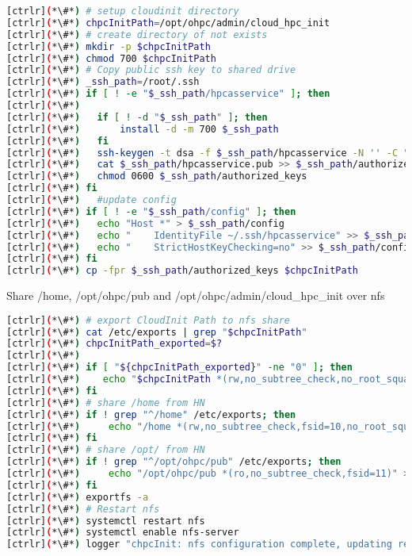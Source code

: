 \begin{lstlisting}[language=bash,keywords={}]
[ctrlr](*\#*) # setup cloudinit directory
[ctrlr](*\#*) chpcInitPath=/opt/ohpc/admin/cloud_hpc_init
[ctrlr](*\#*) # create directory of not exists
[ctrlr](*\#*) mkdir -p $chpcInitPath
[ctrlr](*\#*) chmod 700 $chpcInitPath
[ctrlr](*\#*) # Copy public ssh key to shared drive
[ctrlr](*\#*) _ssh_path=/root/.ssh
[ctrlr](*\#*) if [ ! -e "$_ssh_path/hpcasservice" ]; then
[ctrlr](*\#*) 
[ctrlr](*\#*) 	if [ ! -d "$_ssh_path" ]; then
[ctrlr](*\#*) 		install -d -m 700 $_ssh_path
[ctrlr](*\#*) 	fi
[ctrlr](*\#*) 	ssh-keygen -t dsa -f $_ssh_path/hpcasservice -N '' -C "HPC Cluster key" > /dev/null 2>&1
[ctrlr](*\#*) 	cat $_ssh_path/hpcasservice.pub >> $_ssh_path/authorized_keys
[ctrlr](*\#*) 	chmod 0600 $_ssh_path/authorized_keys
[ctrlr](*\#*) fi
[ctrlr](*\#*) 	#update config
[ctrlr](*\#*) if [ ! -e "$_ssh_path/config" ]; then
[ctrlr](*\#*) 	echo "Host *" > $_ssh_path/config
[ctrlr](*\#*) 	echo "    IdentityFile ~/.ssh/hpcasservice" >> $_ssh_path/config
[ctrlr](*\#*) 	echo "    StrictHostKeyChecking=no" >> $_ssh_path/config
[ctrlr](*\#*) fi
[ctrlr](*\#*) cp -fpr $_ssh_path/authorized_keys $chpcInitPath

\end{lstlisting} 

	Share /home, /opt/ohpc/pub and /opt/ohpc/admin/cloud\_hpc\_init over nfs


\begin{lstlisting}[language=bash,keywords={}]
[ctrlr](*\#*) # export CloudInit Path to nfs share
[ctrlr](*\#*) cat /etc/exports | grep "$chpcInitPath"
[ctrlr](*\#*) chpcInitPath_exported=$?
[ctrlr](*\#*) 
[ctrlr](*\#*) if [ "${chpcInitPath_exported}" -ne "0" ]; then
[ctrlr](*\#*)    echo "$chpcInitPath *(rw,no_subtree_check,no_root_squash)" >> /etc/exports
[ctrlr](*\#*) fi
[ctrlr](*\#*) # share /home from HN
[ctrlr](*\#*) if ! grep "^/home" /etc/exports; then
[ctrlr](*\#*)     echo "/home *(rw,no_subtree_check,fsid=10,no_root_squash)" >> /etc/exports
[ctrlr](*\#*) fi
[ctrlr](*\#*) # share /opt/ from HN
[ctrlr](*\#*) if ! grep "^/opt/ohpc/pub" /etc/exports; then
[ctrlr](*\#*)     echo "/opt/ohpc/pub *(ro,no_subtree_check,fsid=11)" >> /etc/exports
[ctrlr](*\#*) fi
[ctrlr](*\#*) exportfs -a
[ctrlr](*\#*) # Restart nfs
[ctrlr](*\#*) systemctl restart nfs
[ctrlr](*\#*) systemctl enable nfs-server
[ctrlr](*\#*) logger "chpcInit: nfs configuration complete, updating remaining HPC configuration" 
\end{lstlisting} 

